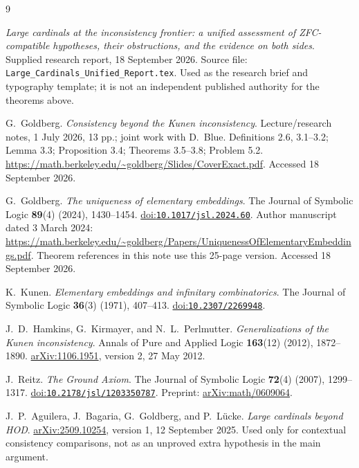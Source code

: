 \documentclass[11pt,letterpaper]{article}
\theoremstyle{definition}
\newcommand{\arxiv}[1]{\href{https://arxiv.org/abs/#1}{arXiv:#1}}
\newcommand{\doi}[1]{\href{https://doi.org/#1}{doi:\nolinkurl{#1}}}
\begin{document}
\clearpage
{}
{}
\begingroup
\small
\begin{thebibliography}{9}
\setlength{\itemsep}{6pt}

\emph{Large cardinals at the inconsistency frontier: a unified assessment of ZFC-compatible hypotheses, their obstructions, and the evidence on both sides}.
Supplied research report, 18 September 2026.
Source file: \texttt{Large\_Cardinals\_Unified\_Report.tex}.
Used as the research brief and typography template; it is not an independent published authority for the theorems above.

G.~Goldberg.
\emph{Consistency beyond the Kunen inconsistency}.
Lecture/research notes, 1 July 2026, 13 pp.; joint work with D.~Blue.
Definitions 2.6, 3.1--3.2; Lemma 3.3; Proposition 3.4; Theorems 3.5--3.8; Problem 5.2.
\url{https://math.berkeley.edu/~goldberg/Slides/CoverExact.pdf}.
Accessed 18 September 2026.

G.~Goldberg.
\emph{The uniqueness of elementary embeddings}.
The Journal of Symbolic Logic \textbf{89}(4) (2024), 1430--1454.
\doi{10.1017/jsl.2024.60}.
Author manuscript dated 3 March 2024:
\url{https://math.berkeley.edu/~goldberg/Papers/UniquenessOfElementaryEmbeddings.pdf}.
Theorem references in this note use this 25-page version.
Accessed 18 September 2026.

K.~Kunen.
\emph{Elementary embeddings and infinitary combinatorics}.
The Journal of Symbolic Logic \textbf{36}(3) (1971), 407--413.
\doi{10.2307/2269948}.

J.~D.~Hamkins, G.~Kirmayer, and N.~L.~Perlmutter.
\emph{Generalizations of the Kunen inconsistency}.
Annals of Pure and Applied Logic \textbf{163}(12) (2012), 1872--1890.
\arxiv{1106.1951}, version 2, 27 May 2012.

J.~Reitz.
\emph{The Ground Axiom}.
The Journal of Symbolic Logic \textbf{72}(4) (2007), 1299--1317.
\doi{10.2178/jsl/1203350787}.
Preprint: \arxiv{math/0609064}.

J.~P.~Aguilera, J.~Bagaria, G.~Goldberg, and P.~L\"ucke.
\emph{Large cardinals beyond HOD}.
\arxiv{2509.10254}, version 1, 12 September 2025.
Used only for contextual consistency comparisons, not as an unproved extra hypothesis in the main argument.

\end{thebibliography}
\endgroup
\end{document}
